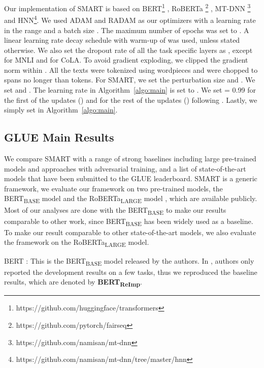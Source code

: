 \documentclass[11pt]{article} \usepackage{url}
\newcommand\model{SMART}
\begin{document}
Our implementation of {\model} is based on  BERT\footnote{https://github.com/huggingface/transformers} \cite{Wolf2019transfomerhf}, RoBERTa \footnote{https://github.com/pytorch/fairseq} \cite{liu2019roberta}, MT-DNN \footnote{https://github.com/namisan/mt-dnn} \cite{liu2020mtmtdnn} and HNN\footnote{https://github.com/namisan/mt-dnn/tree/master/hnn}.
We used ADAM \cite{kingma2014adam} and RADAM \cite{liu2019radam} as our optimizers with a learning rate in the range  and a batch size . 
The maximum number of epochs was set to . 
A linear learning rate decay schedule with warm-up of  was used, unless stated otherwise.
We also set the dropout rate of all the task specific layers as , except  for MNLI and  for CoLA. 
To avoid gradient exploding, we clipped the gradient norm within . 
All the texts were tokenized using wordpieces and were chopped to spans no longer than  tokens. For {\model}, we set the perturbation size  and . We set  and . The learning rate  in Algorithm~\ref{algo:main} is set to .  We set  = 0.99 for the first  of the updates () and  for the rest of the updates  () following \citep{tarvainen2017mean}. 
Lastly, we simply set  in Algorithm~\ref{algo:main}. 

\subsection{GLUE Main Results}
\label{subsec:results}


We compare {\model} with a range of strong baselines including large pre-trained models and approaches with adversarial training, and a list of state-of-the-art models that have been submitted to the GLUE leaderboard. {\model} is a generic framework, we evaluate our framework on two pre-trained models, the BERT\textsubscript{BASE} model \citep{devlin2018bert} and the RoBERTa\textsubscript{LARGE} model \citep{liu2019roberta}, which are available publicly. Most of our analyses are done with the BERT\textsubscript{BASE} to make our results comparable to other work, since BERT\textsubscript{BASE} has been widely used as a baseline. To make our result comparable to other state-of-the-art models, we also evaluate the framework on the RoBERTa\textsubscript{LARGE} model. 

\vskip1pt
\noindent  BERT \cite{devlin2018bert}: This is the BERT\textsubscript{BASE} model released by the authors. In \citet{devlin2018bert}, authors only reported the development results on a few tasks, thus we reproduced the baseline results, which are denoted by \textbf{BERT\textsubscript{ReImp}}.  
\end{document}

